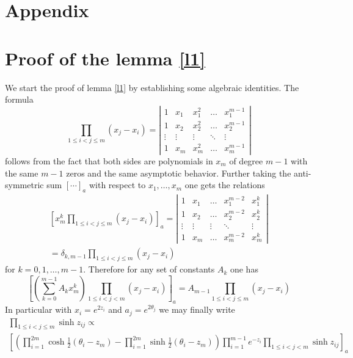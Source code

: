 \documentclass[a4paper,a4paper]{article}
\def\proof{\noindent{\bfseries Proof. }}
\begin{document}
\section*{Appendix}

\renewcommand{\theequation}{\mbox{\Alph{section}.\arabic{equation}}} %
\setcounter{equation}{0}

\section{Proof of the lemma \ref{l1}}

\label{a1}%
\proof%
We start the proof of lemma \ref{l1} by establishing some algebraic
identities. The formula 
\[
\prod_{1\le i<j\le m}(x_{j}-x_{i})=\left| 
\begin{array}{ccccc}
1 & x_{1} & x_{1}^{2} & \dots & x_{1}^{m-1} \\ 
1 & x_{2} & x_{2}^{2} & \dots & x_{2}^{m-1} \\ 
\vdots & \vdots & \vdots & \ddots & \vdots \\ 
1 & x_{m} & x_{m}^{2} & \dots & x_{m}^{m-1}
\end{array}
\right| 
\]
follows from the fact that both sides are polynomials in $x_{m}$ of degree $%
m-1$ with the same $m-1$ zeros and the same asymptotic behavior. Further
taking the anti-symmetric sum $\left[ \cdots \right] _{a}$ with respect to $%
x_{1},\dots ,x_{m}$ one gets the relations 
\begin{multline*}
\left[ x_{m}^{k}\prod_{1\le i<j\le m}(x_{j}-x_{i})\right] _{a}=\left| 
\begin{array}{ccccc}
1 & x_{1} & \dots & x_{1}^{m-2} & x_{1}^{k} \\ 
1 & x_{2} & \dots & x_{2}^{m-2} & x_{2}^{k} \\ 
\vdots & \vdots & \vdots & \ddots & \vdots \\ 
1 & x_{m} & \dots & x_{m}^{m-2} & x_{m}^{k}
\end{array}
\right| \\
=\delta _{k,m-1}\prod_{1\le i<j\leq m}(x_{j}-x_{i})
\end{multline*}
for $k=0,1,\dots ,m-1$. Therefore for any set of constants $A_{k}$ one has 
\[
\left[ \left( \sum_{k=0}^{m-1}A_{k}x_{m}^{k}\right) \prod_{1\le
i<j<m}(x_{j}-x_{i})\right] _{a}=A_{m-1}\prod_{1\le i<j\le m}(x_{j}-x_{i}) 
\]
In particular with $x_{i}=e^{2z_{i}}$ and $a_{j}=e^{2\theta _{j}}$ we may
finally write 
\begin{multline*}
\prod_{1\leq i<j\leq m}\sinh z_{ij}\varpropto \\
\left[ \left( \prod_{i=1}^{2m}\cosh \tfrac{1}{2}(\theta
_{i}-z_{m})-\prod_{i=1}^{2m}\sinh \tfrac{1}{2}(\theta _{i}-z_{m})\right)
\prod_{i=1}^{m-1}e^{-z_{i}}\prod_{1\leq i<j<m}\sinh z_{ij}\right] _{a}
\end{multline*}
\end{document}
